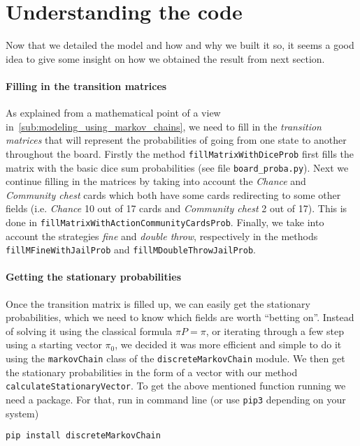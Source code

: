 \section{Understanding the code} %
\label{sec:understanding_the_code}
Now that we detailed the model and how and why we built it so,
it seems a good idea to give some insight on how we obtained
the result from next section.

\paragraph{Filling in the transition matrices} %
\label{par:filling_the_transition_matrices}
As explained from a mathematical point of a view 
in~\ref{sub:modeling_using_markov_chains}, we need to fill in the
\emph{transition matrices} that will represent the probabilities
of going from one state to another throughout the board.
Firstly the method \lstinline|fillMatrixWithDiceProb| first fills the matrix
with the basic dice sum probabilities (see file \lstinline|board_proba.py|).
Next we continue filling in the matrices by taking into account
the \emph{Chance} and \emph{Community chest} cards which both have
some cards redirecting to some other fields (i.e. \emph{Chance} 10
out of 17 cards and \emph{Community chest} 2 out of 17).
This is done in \lstinline|fillMatrixWithActionCommunityCardsProb|.
Finally, we take into account the strategies \emph{fine} and \emph{double throw},
respectively in the methods \lstinline|fillMFineWithJailProb|
and \lstinline|fillMDoubleThrowJailProb|.


\paragraph{Getting the stationary probabilities} %
\label{par:getting_the_stationary_probabilities}
Once the transition matrix is filled up, we can easily
get the stationary probabilities, which we need to know
which fields are worth \enquote{betting on}.
Instead of solving it using the classical formula $\pi P = \pi$,
or iterating through a few step using a starting vector $\pi_0$,
we decided it was more efficient and simple to do it using the 
\lstinline|markovChain| class of the \lstinline|discreteMarkovChain| module.
We then get the stationary probabilities in the form of a vector
with our method \lstinline|calculateStationaryVector|.
To get the above mentioned function running we need a package.
For that, run in command line (or use \lstinline|pip3| depending on your system)
\begin{center}
  \lstinline|pip install discreteMarkovChain|
\end{center}

